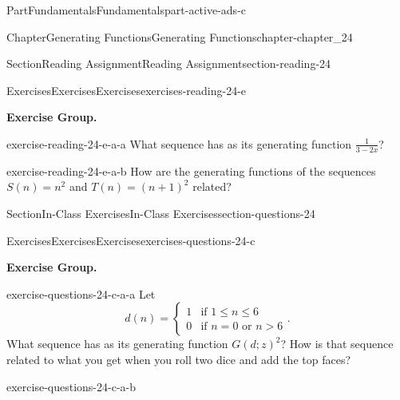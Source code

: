 \documentclass[oneside,10pt,]{book}
\numberwithin{equation}{section}
\newcommand{\gt}{>}
\begin{document}
\begin{partptx}{Part}{Fundamentals}{}{Fundamentals}{}{}{part-active-ads-c}
\begin{chapterptx}{Chapter}{Generating Functions}{}{Generating Functions}{}{}{chapter-chapter_24}
\begin{sectionptx}{Section}{Reading Assignment}{}{Reading Assignment}{}{}{section-reading-24}
%
\begin{exercises-subsection-numberless}{Exercises}{Exercises}{}{Exercises}{}{}{exercises-reading-24-e}
\par\medskip\noindent%
\textbf{Exercise Group.}\space\space%
\begin{exercisegroup}
\begin{divisionexerciseeg}{1}{}{}{exercise-reading-24-e-a-a}%
What sequence has as its generating function \(\frac{1}{3-2x}\)?%
\end{divisionexerciseeg}%
\begin{divisionexerciseeg}{2}{}{}{exercise-reading-24-e-a-b}%
How are the generating functions of the sequences \(S(n)=n^2\) and \(T(n)=(n+1)^2\) related?%
\end{divisionexerciseeg}%
\end{exercisegroup}
\par\medskip\noindent
\end{exercises-subsection-numberless}
\end{sectionptx}
%
%
\typeout{************************************************}
\typeout{************************************************}
%
\begin{sectionptx}{Section}{In-Class Exercises}{}{In-Class Exercises}{}{}{section-questions-24}
%
%
%
\typeout{************************************************}
\typeout{************************************************}
%
\begin{exercises-subsection-numberless}{Exercises}{Exercises}{}{Exercises}{}{}{exercises-questions-24-c}
\par\medskip\noindent%
\textbf{Exercise Group.}\space\space%
\begin{exercisegroup}
\begin{divisionexerciseeg}{1}{}{}{exercise-questions-24-c-a-a}%
Let%
\begin{equation*}
d(n)=
\begin{cases}
1 & \textrm{if }1 \leq n \leq 6\\
0 & \textrm{if }n=0\textrm{ or }n \gt 6
\end{cases}.
\end{equation*}
What sequence has as its generating function \(G(d;z)^2\)?  How is that sequence related to what you get when you roll two dice and add the top faces?%
\end{divisionexerciseeg}%
\begin{divisionexerciseeg}{2}{}{}{exercise-questions-24-c-a-b}%

\end{divisionexerciseeg}
\end{exercisegroup}
\end{exercises-subsection-numberless}
\end{sectionptx}
\end{chapterptx}
\end{partptx}
\end{document}
